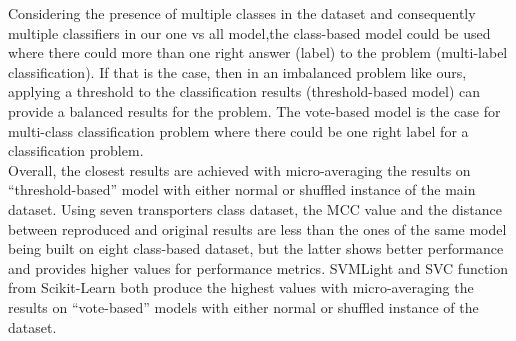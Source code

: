         Considering the presence of multiple classes in the dataset and consequently multiple classifiers in our 
        one vs all model,the class-based model could be used where there could more than one right answer (label) 
        to the problem (multi-label classification). If that is the case, then in an imbalanced problem like ours, 
        applying a threshold to the classification results (threshold-based model) can provide a balanced results 
        for the problem. The vote-based model is the case for multi-class classification problem where there could 
        be one right label for a classification problem.\\
        
        Overall, the closest results are achieved with micro-averaging the results on “threshold-based” model with either 
        normal or shuffled instance of the main dataset. Using seven transporters class dataset, the MCC value and the distance 
        between reproduced and original results are less than the ones of the same model being built on eight class-based dataset, 
        but the latter shows better performance and provides higher values for performance metrics. 
        SVMLight and SVC function from Scikit-Learn both produce the highest values with micro-averaging the results 
        on “vote-based” models with either normal or shuffled instance of the dataset.\\
    

